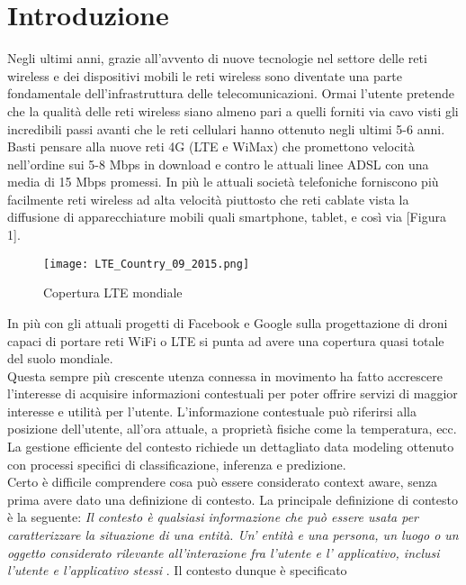 \chapter*{Introduzione}
Negli ultimi anni, grazie all'avvento di nuove tecnologie nel settore delle reti wireless
e dei dispositivi mobili le reti wireless sono diventate una parte fondamentale
dell'infrastruttura delle telecomunicazioni. Ormai l'utente pretende che la qualit\`a
delle reti wireless siano almeno pari a quelli forniti via cavo visti gli incredibili passi avanti
che le reti cellulari hanno ottenuto negli ultimi 5-6 anni.
Basti pensare alla nuove reti 4G (LTE e WiMax) che promettono velocit\`a nell'ordine sui 5-8 Mbps
in download e contro le attuali linee ADSL con una media di 15 Mbps promessi.
In pi\`u le attuali societ\`a telefoniche forniscono pi\`u facilmente reti wireless ad alta velocit\`a
piuttosto che reti cablate vista la diffusione di apparecchiature mobili quali smartphone, tablet, e cos\`i via [Figura 1].
\begin{figure}
\begin{center}
\texttt{[image: LTE\_Country\_09\_2015.png]}
\caption[Cop LTE]{Copertura LTE mondiale}
\label{etichetta}
\end{center}
\end{figure}
In pi\`u con gli attuali progetti di Facebook e Google sulla progettazione di droni capaci di portare
reti WiFi o LTE si punta ad avere una copertura quasi totale del suolo mondiale.\\
Questa sempre pi\`u crescente utenza connessa in movimento ha fatto accrescere l'interesse di
acquisire informazioni contestuali per poter offrire servizi di maggior interesse e utilit\`a
per l'utente. L'informazione contestuale pu\`o riferirsi alla posizione dell'utente, all'ora attuale,
a propriet\`a fisiche come la temperatura, ecc.
La gestione efficiente del contesto richiede un dettagliato data modeling ottenuto
con processi specifici di classificazione, inferenza e predizione.\\
Certo \`e difficile comprendere cosa pu\`o essere considerato context aware,
senza prima avere dato una definizione di contesto. La principale definizione
di contesto \`e la seguente:
\textit{Il contesto \`e qualsiasi informazione che pu\`o essere usata per caratterizzare
la situazione di una entit\`a. Un' entit\`a e una persona, un luogo o un oggetto considerato rilevante all'interazione fra l'utente
e l' applicativo, inclusi l'utente e l'applicativo stessi}
\cite{cit_48}. Il contesto dunque \`e specificato
